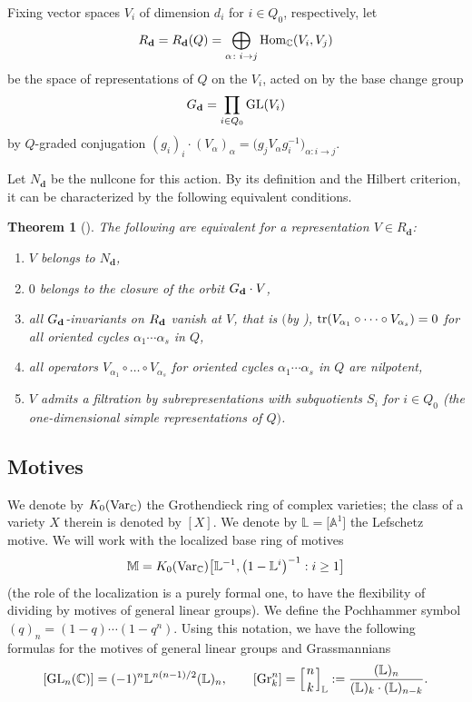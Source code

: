 \documentclass[pdftex]{sigma}
\numberwithin{equation}{section}
\newtheorem{Theorem}{Theorem}[section]
\theoremstyle{definition}
\begin{document}
Fixing vector spaces $V_i$ of dimension $d_i$ for $i\in Q_0$, respectively, let \[R_\mathbf{d}=R_\mathbf{d}(Q)=\bigoplus_{\alpha\colon i\rightarrow j}{\rm Hom}_\mathbb{C}(V_i,V_j)\] be the space of representations of $Q$ on the $V_i$, acted on by the base change group \[G_\mathbf{d}=\prod_{i\in Q_0}{\rm GL}(V_i)\] by $Q$-graded conjugation
$(g_i)_i\cdot(V_\alpha)_\alpha=\bigl(g_jV_\alpha g_i^{-1}\bigr)_{\alpha\colon i\rightarrow j}$.

Let $N_\mathbf{d}$ be the nullcone for this action. By its definition and the Hilbert criterion, it can be characterized by the following equivalent conditions.

\begin{Theorem}[{\cite[Section 1.4]{LB}}] The following are equivalent for a representation $V\in R_\mathbf{d}$:
\begin{enumerate}\itemsep=0pt
\item[$(1)$] $V$ belongs to $N_\mathbf{d}$,
\item[$(2)$] $0$ belongs to the closure of the orbit $G_{\bf d}\cdot V$,
\item[$(3)$] all $G_{\bf d}$-invariants on $R_{\bf d}$ vanish at $V$, that is $($by {\rm\cite{LP})}, ${\rm tr}(V_{\alpha_1}\circ\dots\circ V_{\alpha_s})=0$ for all oriented cycles $\alpha_1\cdots\alpha_s$ in $Q$,
\item[$(4)$] all operators $V_{\alpha_1}\circ\dots\circ V_{\alpha_s}$ for oriented cycles $\alpha_1\cdots\alpha_s$ in $Q$ are nilpotent,
\item[$(5)$] $V$ admits a filtration by subrepresentations with subquotients $S_i$ for $i\in Q_0$ {\rm (}the one-dimensional simple representations of $Q)$.
\end{enumerate}
\end{Theorem}

\subsection{Motives}

We denote by $K_0({\rm Var}_\mathbb{C})$ the Grothendieck ring of complex varieties; the class of a variety $X$ therein is denoted by $[X]$. We denote by $\mathbb{L}=\big[\mathbb{A}^1\big]$ the Lefschetz motive. We will work with the localized base ring of motives \[\mathbb{M}=K_0({\rm Var}_\mathbb{C})\big[\mathbb{L}^{-1},\bigl(1-\mathbb{L}^i\bigr)^{-1} : i\geq 1\big]\]
(the role of the localization is a purely formal one, to have the flexibility of dividing by motives of general linear groups). We define the Pochhammer symbol $(q)_n=(1-q)\cdots(1-q^n)$. Using this notation, we have the following formulas for the motives of general linear groups and Grassmannians
\[[{\rm GL}_n(\mathbb{C})]=(-1)^n\mathbb{L}^{n(n-1)/2}(\mathbb{L})_n,\qquad [{\rm Gr}_k^n]=\left[{n\atop k}\right]_\mathbb{L}:=\frac{(\mathbb{L})_n}{(\mathbb{L})_k\cdot(\mathbb{L})_{n-k}}.\]
\end{document}

